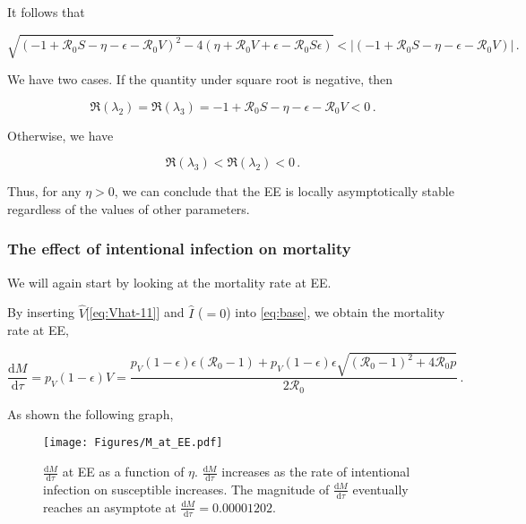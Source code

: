 \documentclass[12pt]{article}
\newcommand\dbyd[2]{\frac{\mathrm d{#1}}{\mathrm d{#2}}}
\newcommand{\R}{\mathcal{R}}
\newcommand{\pmV}{p_{V}}
\begin{document}
It follows that
\begin{linenomath*}
\begin{equation}
\sqrt{(-1+\R_0 S-\eta-\epsilon-\R_0 V)^2-4(\eta+\R_0 V+\epsilon-\R_0 S\epsilon)}<|(-1+\R_0 S-\eta-\epsilon-\R_0 V)|\,.
\end{equation}
\end{linenomath*}

We have two cases. If the quantity under square root is negative, then
\begin{linenomath*}
\begin{equation}
\Re(\lambda_2)=\Re(\lambda_3)=-1+\R_0 S-\eta-\epsilon-\R_0 V<0\,.
\end{equation}
\end{linenomath*}

Otherwise, we have
\begin{linenomath*}
\begin{equation}
\Re(\lambda_3)<\Re(\lambda_2)<0\,.
\end{equation}
\end{linenomath*}

Thus, for any $\eta>0$, we can conclude that the EE is locally asymptotically stable regardless of the values of other parameters.

\subsubsection{The effect of intentional infection on mortality}
We will again start by looking at the mortality rate at EE.

By inserting $\hat{V}$[\autoref{eq:Vhat-11}] and $\hat{I}$ ($=0$) into \autoref{eq:base}, we obtain the mortality rate at EE,
\begin{linenomath*}
\begin{equation}
\dbyd{M}{\tau}=\pmV(1-\epsilon)V=\frac{\pmV(1-\epsilon)\epsilon(\R_0 -1)+ \pmV(1-\epsilon)\epsilon \sqrt{(\R_0-1)^2+4\R_0 p}}{2\R_0}\,. \label{eq:dMdt}
\end{equation}
\end{linenomath*}
As shown the following graph,
\begin{figure}[H]
  \centering
  \texttt{[image: Figures/M\_at\_EE.pdf]}
  \caption{$\dbyd{M}{\tau}$ at EE as a function of $\eta$. $\dbyd{M}{\tau}$ increases as the rate of intentional infection on susceptible increases. The magnitude of $\dbyd{M}{\tau}$ eventually reaches an asymptote at $\dbyd{M}{\tau}=0.00001202$.}
\end{figure}
\end{document}
